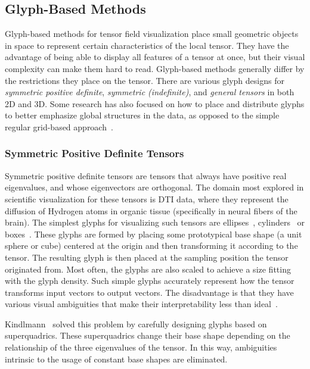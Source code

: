 \subsection{Glyph-Based Methods} %
\label{sub:tensor_glyph_based}
%
Glyph-based methods for tensor field visualization place small geometric objects
in space to represent certain characteristics of the local tensor.
%
They have the advantage of being able to display all features of a tensor at
once, but their visual complexity can make them hard to read.
%
Glyph-based methods generally differ by the restrictions they place on the
tensor.
%
There are various glyph designs for \emph{symmetric positive definite},
\emph{symmetric (indefinite)}, and \emph{general tensors} in both \ac{2D} and
\ac{3D}.
%
Some research has also focused on how to place and distribute glyphs to better
emphasize global structures in the data, as opposed to the simple regular
grid-based approach~\cite{Kindlmann2006,Feng2008}.
%

\subsubsection{Symmetric Positive Definite Tensors} %
%
Symmetric positive definite tensors are tensors that always have positive
real eigenvalues, and whose eigenvectors are orthogonal.
%
The domain most explored in scientific visualization for these tensors is
\ac{DTI} data, where they represent the diffusion of Hydrogen atoms in organic
tissue (specifically in neural fibers of the brain).
%
The simplest glyphs for visualizing such tensors are ellipses~\cite{Basser1996},
cylinders~\cite{Wiegell2000} or boxes~\cite{Schroeder2006}.
%
These glyphs are formed by placing some prototypical base shape (a unit sphere
or cube) centered at the origin and then transforming it according to the
tensor.
%
The resulting glyph is then placed at the sampling position the tensor
originated from.
%
Most often, the glyphs are also scaled to achieve a size fitting with the
glyph density.
%
Such simple glyphs accurately represent how the tensor transforms input vectors
to output vectors.
%
The disadvantage is that they have various visual ambiguities that make their
interpretability less than ideal~\cite{Kindlmann2004}.
%

%
Kindlmann~\cite{Kindlmann2004} solved this problem by carefully designing
glyphs based on superquadrics.
%
These superquadrics change their base shape depending on the relationship of
the three eigenvalues of the tensor.
%
In this way, ambiguities intrinsic to the usage of constant base shapes are
eliminated.
%

